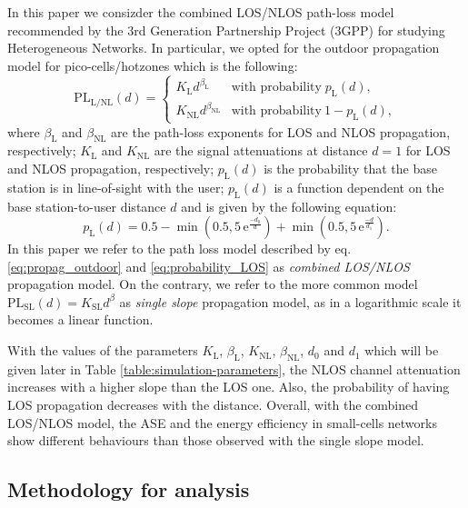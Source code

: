 \documentclass[twocoumn]{IEEEtran}
\begin{document}
In this paper we consizder  the combined LOS/NLOS path-loss
model recommended by the 3rd Generation Partnership Project (3GPP)
for studying Heterogeneous Networks. In particular, we opted for
the outdoor propagation model for pico-cells/hotzones \cite{3GPP36814}
which is the following: 
\begin{equation}
\mathrm{PL_{\mathrm{L/NL}}}(d)=\begin{cases}
K_{\mathrm{L}}d^{\beta_{\mathrm{L}}} & \text{with probability}\; p_{\mathrm{L}}(d),\\
K_{\mathrm{NL}}d^{\beta_{\mathrm{NL}}} & \text{with probability}\:1-p_{\mathrm{L}}(d),
\end{cases}\label{eq:propag_outdoor}
\end{equation}
where $\beta_{\mathrm{L}}$ and $\beta_{\mathrm{NL}}$ are the path-loss exponents for LOS and NLOS propagation, respectively; $K_{\mathrm{L}}$ and $K_{\mathrm{NL}}$ are the signal attenuations at distance $d=1$  for LOS and NLOS propagation, respectively; $p_{\mathrm{L}}(d)$ is the probability that the base station is in line-of-sight with the user; $p_{\mathrm{L}}(d)$ is a function dependent on the base station-to-user distance $d$  and is given by the following equation: 
\begin{equation}
p_{\mathrm{L}}(d)=0.5-\min(0.5,5\,\mathrm{e}^{\frac{-d_0}{d}})+\min(0.5,5\,\mathrm{e}^{\frac{-d}{d_1}}).\label{eq:probability_LOS}
\end{equation}
In this paper we refer to the path loss model described by eq. \eqref{eq:propag_outdoor}
and \eqref{eq:probability_LOS} as \textit{combined LOS/NLOS} propagation
model. On the contrary, we refer to the more common model $\mathrm{PL}_{\mathrm{SL}}(d)=K_{\mathrm{SL}}d^{\beta}$
as \textit{single slope} propagation model, as in a logarithmic scale
it becomes a linear function. 

With the values of the parameters $K_{\mathrm{L}}$, $\beta_{\mathrm{L}}$, $K_{\mathrm{NL}}$, $\beta_{\mathrm{NL}}$, $d_0$ and $d_1$ which will be given later in Table \ref{table:simulation-parameters}, the NLOS channel attenuation  increases with a higher slope than the LOS one. Also, the probability of having LOS propagation decreases with the distance. Overall, with the combined LOS/NLOS model, the ASE and the energy efficiency  in small-cells networks show different behaviours than those observed with the single slope model. 

\vspace{-3mm}
\subsection{Methodology for analysis} \label{sec:Methodology}
\end{document}

